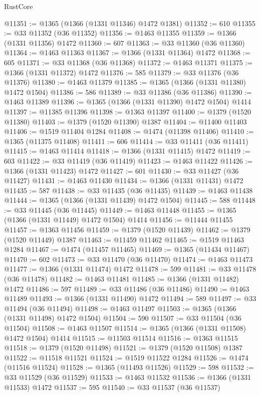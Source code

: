 \begin{lexlean}{RustCore}
\begin{coremodule}
@11351 := @1365 (@1366 (@1331 @11346) @1472 @1381)
@11352 := 610
@11355 := @33 @11352 (@36 @11352)
@11356 := @1463 @11355
@11359 := @1366 (@1331 @11356) @1472
@11360 := 607
@11363 := @33 @11360 (@36 @11360)
@11364 := @1463 @11363
@11367 := @1366 (@1331 @11364) @1472
@11368 := 605
@11371 := @33 @11368 (@36 @11368)
@11372 := @1463 @11371
@11375 := @1366 (@1331 @11372) @1472
@11376 := 585
@11379 := @33 @11376 (@36 @11376)
@11380 := @1463 @11379
@11385 := @1365 (@1366 (@1331 @11380) @1472 @1504)
@11386 := 586
@11389 := @33 @11386 (@36 @11386)
@11390 := @1463 @11389
@11396 := @1365 (@1366 (@1331 @11390) @1472 @1504) @1414
@11397 := @11385 @11396
@11398 := @1363 @11397
@11400 := @1379 (@1520 @11380)
@11403 := @1379 (@1520 @11390) @1387
@11404 := @11400 @11403
@11406 := @1519 @11404 @1284
@11408 := @1474 (@11398 @11406)
@11410 := @1365 (@11375 @11408)
@11411 := 606
@11414 := @33 @11411 (@36 @11411)
@11415 := @1463 @11414
@11418 := @1366 (@1331 @11415) @1472
@11419 := 603
@11422 := @33 @11419 (@36 @11419)
@11423 := @1463 @11422
@11426 := @1366 (@1331 @11423) @1472
@11427 := 601
@11430 := @33 @11427 (@36 @11427)
@11431 := @1463 @11430
@11434 := @1366 (@1331 @11431) @1472
@11435 := 587
@11438 := @33 @11435 (@36 @11435)
@11439 := @1463 @11438
@11444 := @1365 (@1366 (@1331 @11439) @1472 @1504)
@11445 := 588
@11448 := @33 @11445 (@36 @11445)
@11449 := @1463 @11448
@11455 := @1365 (@1366 (@1331 @11449) @1472 @1504) @1414
@11456 := @11444 @11455
@11457 := @1363 @11456
@11459 := @1379 (@1520 @11439)
@11462 := @1379 (@1520 @11449) @1387
@11463 := @11459 @11462
@11465 := @1519 @11463 @1284
@11467 := @1474 (@11457 @11465)
@11469 := @1365 (@11434 @11467)
@11470 := 602
@11473 := @33 @11470 (@36 @11470)
@11474 := @1463 @11473
@11477 := @1366 (@1331 @11474) @1472
@11478 := 599
@11481 := @33 @11478 (@36 @11478)
@11482 := @1463 @11481
@11485 := @1366 (@1331 @11482) @1472
@11486 := 597
@11489 := @33 @11486 (@36 @11486)
@11490 := @1463 @11489
@11493 := @1366 (@1331 @11490) @1472
@11494 := 589
@11497 := @33 @11494 (@36 @11494)
@11498 := @1463 @11497
@11503 := @1365 (@1366 (@1331 @11498) @1472 @1504)
@11504 := 590
@11507 := @33 @11504 (@36 @11504)
@11508 := @1463 @11507
@11514 := @1365 (@1366 (@1331 @11508) @1472 @1504) @1414
@11515 := @11503 @11514
@11516 := @1363 @11515
@11518 := @1379 (@1520 @11498)
@11521 := @1379 (@1520 @11508) @1387
@11522 := @11518 @11521
@11524 := @1519 @11522 @1284
@11526 := @1474 (@11516 @11524)
@11528 := @1365 (@11493 @11526)
@11529 := 598
@11532 := @33 @11529 (@36 @11529)
@11533 := @1463 @11532
@11536 := @1366 (@1331 @11533) @1472
@11537 := 595
@11540 := @33 @11537 (@36 @11537)

\end{coremodule}
\end{lexlean}
